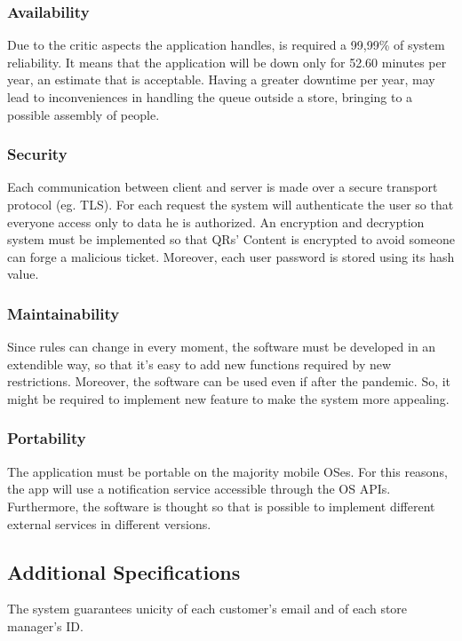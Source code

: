 \documentclass{article}
\begin{document}
		\subsubsection{Availability}
		Due to the critic aspects the application handles, is required a 99,99\% of system reliability. It means that the application will be down only for 52.60 minutes per year, an estimate that is acceptable. Having a greater downtime per year, may lead to inconveniences in handling the queue outside a store, bringing to a possible assembly of people.
		\subsubsection{Security}
		Each communication between client and server is made over a secure transport protocol (eg. TLS). For each request the system will authenticate the user so that everyone access only to data he is authorized. An encryption and decryption system must be implemented so that QRs' Content is encrypted to avoid someone can forge a malicious ticket. Moreover, each user password is stored using its hash value. 
		\subsubsection{Maintainability}
		Since rules can change in every moment, the software must be developed in an extendible way, so that it's easy to add new functions required by new restrictions. Moreover, the software can be used even if after the pandemic. So, it might be required to implement new feature to make the system more appealing.
		\subsubsection{Portability}
		The application must be portable on the majority mobile OSes. For this reasons, the app will use a notification service accessible through the OS APIs. Furthermore, the software is thought so that is possible to implement different external services in different versions.
		\subsection{Additional Specifications}
	The system guarantees unicity of each customer's email and of each store manager's ID.
	
	\newpage
	
\end{document}
